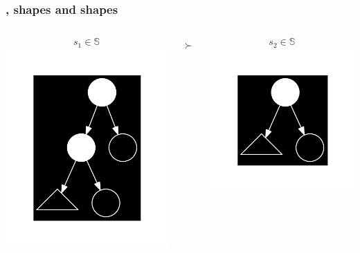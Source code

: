\begin{frame}

\frametitle{\D{}, shapes and shapes}

\begin{columns}

\begin{center}
$$s_1\in\mathbb{S}$$
\includegraphics[scale=0.5]{figures/shape}
\end{center}


\begin{center}
{\fontsize{40}{20}$\succ$}
\end{center}


\begin{center}
$$s_2\in\mathbb{S}$$
\includegraphics[scale=0.5]{figures/shape-2}
\end{center}


\end{columns}
\end{frame}
